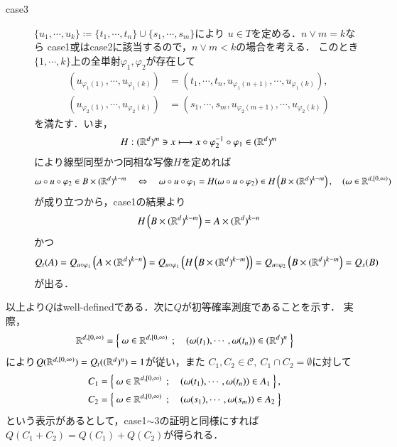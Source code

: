 \begin{prf}
\begin{description}
\begin{description}
					\item[case3]
						$\{u_1,\cdots,u_k\} \coloneqq \{t_1,\cdots,t_n\} \cup \{s_1,\cdots,s_m\}$により
						$u \in T$を定める．$n \vee m=k$なら
						case1或はcase2に該当するので，$n \vee m < k$の場合を考える．
						このとき$\{1,\cdots,k\}$上の全単射$\varphi_1,\varphi_2$が存在して
						\begin{align}
							(u_{\varphi_1(1)},\cdots, u_{\varphi_1(k)})
							&= (t_1, \cdots, t_n,u_{\varphi_1(n+1)},\cdots,u_{\varphi_1(k)}), \\
							(u_{\varphi_2(1)},\cdots, u_{\varphi_2(k)})
							&= (s_1, \cdots, s_m,u_{\varphi_2(m+1)},\cdots,u_{\varphi_2(k)})
						\end{align}
						を満たす．いま，
						\begin{align}
							H:(\mathbb{R}^d)^m \ni x \longmapsto x \circ \varphi_2^{-1} \circ \varphi_1 \in (\mathbb{R}^d)^m
						\end{align}
						により線型同型かつ同相な写像$H$を定めれば
						\begin{align}
							\omega \circ u \circ \varphi_2 \in B \times (\mathbb{R}^d)^{k-m}
							\quad \Leftrightarrow \quad 
							\omega \circ u \circ \varphi_1 
							= H(\omega \circ u \circ \varphi_2) \in H\left( B \times (\mathbb{R}^d)^{k-m} \right),
							\quad (\omega \in \mathbb{R}^{d,[0,\infty)})
						\end{align}
						が成り立つから，case1の結果より
						\begin{align}
							H\left( B \times (\mathbb{R}^d)^{k-m} \right) = A \times (\mathbb{R}^d)^{k-n}
						\end{align}
						かつ
						\begin{align}
							Q_t(A) 
							= Q_{u \circ \varphi_1} \left( A \times (\mathbb{R}^d)^{k-n} \right)
							= Q_{u \circ \varphi_1} \left( H\left( B \times (\mathbb{R}^d)^{k-m} \right) \right)
							= Q_{u \circ \varphi_2} \left( B \times (\mathbb{R}^d)^{k-m} \right)
							= Q_s(B)
						\end{align}
						が出る．
				\end{description}
				以上より$Q$はwell-definedである．次に$Q$が初等確率測度であることを示す．
				実際，
				\begin{align}
					\mathbb{R}^{d,[0,\infty)} = \left\{\ \omega \in \mathbb{R}^{d,[0,\infty)}\ \, ; \quad (\omega(t_1),\cdots,\omega(t_n)) \in (\mathbb{R}^d)^n\ \right\}
				\end{align}
				により$Q(\mathbb{R}^{d,[0,\infty)}) = Q_t((\mathbb{R}^d)^n) = 1$が従い，また
				$C_1,C_2 \in \mathscr{C},\ C_1 \cap C_2 = \emptyset$に対して
				\begin{align}
					C_1 &= \left\{\ \omega \in \mathbb{R}^{d,[0,\infty)}\ \, ; \quad (\omega(t_1),\cdots,\omega(t_n)) \in A_1\ \right\}, \\
					C_2 &= \left\{\ \omega \in \mathbb{R}^{d,[0,\infty)}\ \, ; \quad (\omega(s_1),\cdots,\omega(s_m)) \in A_2\ \right\}
				\end{align}
				という表示があるとして，case1$\sim$3の証明と同様にすれば$Q(C_1 + C_2) = Q(C_1) + Q(C_2)$が得られる．
		\end{description}
	\end{prf}